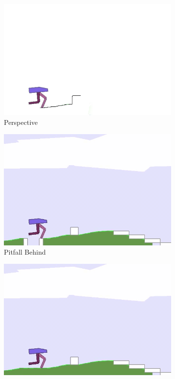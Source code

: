 \begin{figure}
	\begin{subfigure}{.32\textwidth}
		\centering
		\includegraphics[width=0.99\linewidth]{figures/bipedal/po/lidarcover.png}
		\caption{Perspective}
		\label{fig:lidar_cover}
	\end{subfigure}
	\begin{subfigure}{.32\textwidth}
		\centering
		\includegraphics[width=0.99\linewidth]{figures/bipedal/po/pitfall_behind.png}
		\caption{Pitfall Behind}
		\label{fig:pitfall_behind}
	\end{subfigure}
		\begin{subfigure}{.32\textwidth}
		\centering
		\includegraphics[width=0.99\linewidth]{figures/bipedal/po/no_pitfall_behind.png}

\end{subfigure}
\end{figure}
